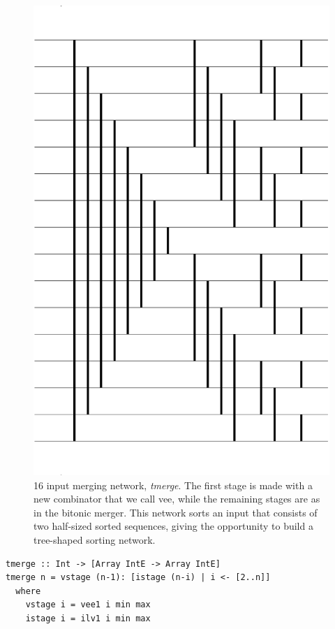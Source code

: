\begin{figure}
\centering
\includegraphics[scale=0.25]{./expressive/mixed}
\caption{16 input merging network, {\em tmerge}. The first stage
is made with a new combinator that we call vee, while
the remaining stages are as in the bitonic merger.
This network sorts an input that consists of two half-sized
sorted sequences, giving the opportunity to build a tree-shaped
sorting network.}
\label{fig:mixedMerger}
\end{figure}

\begin{codesize}
\begin{verbatim}
tmerge :: Int -> [Array IntE -> Array IntE]
tmerge n = vstage (n-1): [istage (n-i) | i <- [2..n]]
  where
    vstage i = vee1 i min max 
    istage i = ilv1 i min max
\end{verbatim}
\end{codesize}

